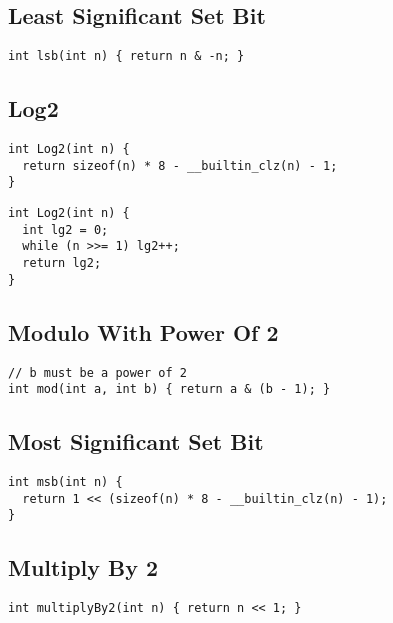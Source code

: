 \documentclass[twoside]{article}
\begin{document}
\begin{multicols*}{2}
\subsection*{Least Significant Set Bit}
\begin{verbatim}
int lsb(int n) { return n & -n; }
\end{verbatim}

\subsectionfont{\large\bfseries\sffamily\underline}
\subsection*{Log2}
\begin{verbatim}
int Log2(int n) {
  return sizeof(n) * 8 - __builtin_clz(n) - 1;
}
\end{verbatim}
\vspace{-12pt}
\begin{verbatim}
int Log2(int n) {
  int lg2 = 0;
  while (n >>= 1) lg2++;
  return lg2;
}
\end{verbatim}

\subsectionfont{\large\bfseries\sffamily\underline}
\subsection*{Modulo With Power Of 2}
\begin{verbatim}
// b must be a power of 2
int mod(int a, int b) { return a & (b - 1); }
\end{verbatim}

\subsectionfont{\large\bfseries\sffamily\underline}
\subsection*{Most Significant Set Bit}
\begin{verbatim}
int msb(int n) {
  return 1 << (sizeof(n) * 8 - __builtin_clz(n) - 1);
}
\end{verbatim}

\subsectionfont{\large\bfseries\sffamily\underline}
\subsection*{Multiply By 2}
\begin{verbatim}
int multiplyBy2(int n) { return n << 1; }
\end{verbatim}


\end{multicols*}
\end{document}
